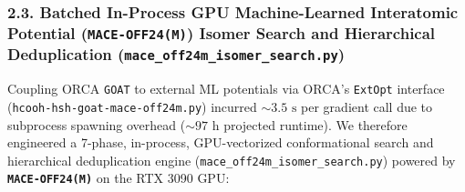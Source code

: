 \documentclass[journal=jpclcd,manuscript=article]{achemso}
\begin{document}
\subsubsection{2.3. Batched In-Process GPU Machine-Learned Interatomic Potential (\texttt{MACE-OFF24(M)}) Isomer Search and Hierarchical Deduplication (\texttt{mace\_off24m\_isomer\_search.py})}
Coupling ORCA \texttt{GOAT} to external ML potentials via ORCA's \texttt{ExtOpt} interface (\texttt{hcooh-hsh-goat-mace-off24m.py}) incurred $\sim 3.5\text{ s}$ per gradient call due to subprocess spawning overhead ($\sim 97\text{ h}$ projected runtime). We therefore engineered a 7-phase, in-process, GPU-vectorized conformational search and hierarchical deduplication engine (\texttt{mace\_off24m\_isomer\_search.py}) powered by \textbf{\texttt{MACE-OFF24(M)}} \cite{Kovacs2025, Batatia2022} on the RTX 3090 GPU:
\end{document}
